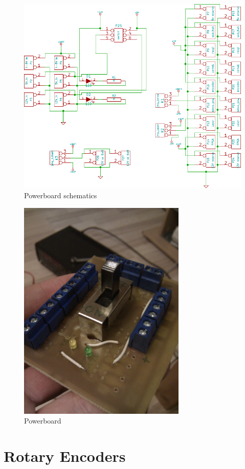 \documentclass[a4paper
               ,10pt
               ,DIV=10 %
               ,BCOR=0.3cm
               ,pagesize %
               ,headings=small
               ,bibtotoc
               ]
               {scrartcl}
\begin{document}
\begin{figure}[H]
\begin{center}
\includegraphics[width=0.7\linewidth]{pic/powerboard}
\caption{Powerboard schematics}
\end{center}
\label{figpowerboardscm}
\end{figure}

\begin{figure}[H]
\begin{center}
\includegraphics[width=8cm]{pic/powerboardr.jpg}
\caption{Powerboard}
\end{center}
\label{figpowerboardr}
\end{figure}


\section{Rotary Encoders} %
\end{document}
